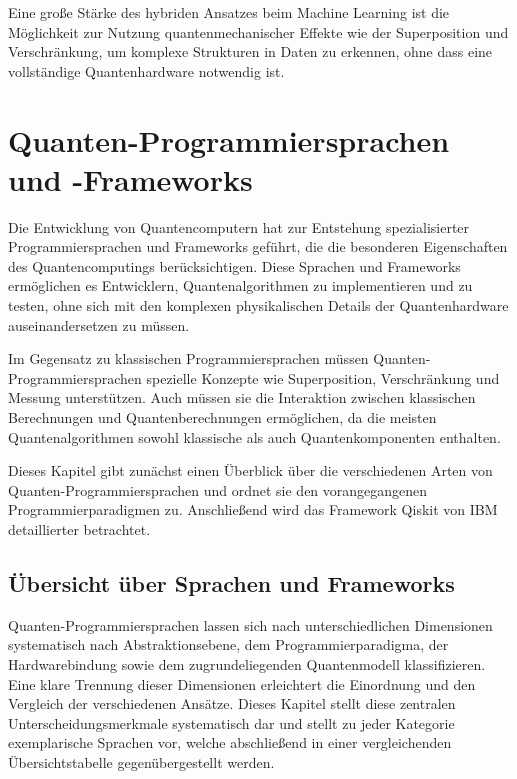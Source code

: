 Eine große Stärke des hybriden Ansatzes beim Machine Learning ist die Möglichkeit zur Nutzung quantenmechanischer Effekte wie der Superposition und Verschränkung, um komplexe Strukturen in Daten zu erkennen, ohne dass eine vollständige Quantenhardware notwendig ist. \autocite[2-4]{alchieri_introduction_2021}

\section{Quanten-Programmiersprachen und -Frameworks}
\label{sec:programming-languages}

Die Entwicklung von Quantencomputern hat zur Entstehung spezialisierter Programmiersprachen und Frameworks geführt, die die besonderen Eigenschaften des Quantencomputings berücksichtigen. Diese Sprachen und Frameworks ermöglichen es Entwicklern, Quantenalgorithmen zu implementieren und zu testen, ohne sich mit den komplexen physikalischen Details der Quantenhardware auseinandersetzen zu müssen.

Im Gegensatz zu klassischen Programmiersprachen müssen Quanten-Programmier\-sprachen spezielle Konzepte wie Superposition, Verschränkung und Messung unterstützen. Auch müssen sie die Interaktion zwischen klassischen Berechnungen und Quantenberechnungen ermöglichen, da die meisten Quantenalgorithmen sowohl klassische als auch Quantenkomponenten enthalten.

Dieses Kapitel gibt zunächst einen Überblick über die verschiedenen Arten von Quanten-Programmiersprachen und ordnet sie den vorangegangenen Programmierparadigmen zu. Anschließend wird das Framework Qiskit von IBM detaillierter betrachtet.

\subsection{Übersicht über Sprachen und Frameworks}
\label{sec:lang-frameworks}

Quanten-Programmiersprachen lassen sich nach unterschiedlichen Dimensionen systematisch nach Abstraktionsebene, dem Programmierparadigma, der Hardwarebindung sowie dem zugrundeliegenden Quantenmodell klassifizieren. Eine klare Trennung dieser Dimensionen erleichtert die Einordnung und den Vergleich der verschiedenen Ansätze. Dieses Kapitel stellt diese zentralen Unterscheidungsmerkmale systematisch dar und stellt zu jeder Kategorie exemplarische Sprachen vor, welche abschließend in einer vergleichenden Übersichtstabelle gegenübergestellt werden.

